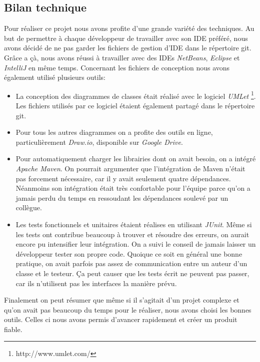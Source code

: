 \documentclass[10pt,a4paper]{book}
\begin{document}
\subsection{Bilan technique}
Pour réaliser ce projet nous avons profite d'une grande variété des techniques. Au but de permettre à chaque développeur de travailler avec son IDE préféré, nous avons décidé de ne pas garder les fichiers de gestion d'IDE dans le répertoire git. Grâce a çà, nous avons réussi à travailler avec des IDEs \textit{NetBeans}, \textit{Eclipse} et \textit{IntelliJ} en même temps. Concernant les fichiers de conception nous avons également utilisé plusieurs outils:
\begin{itemize}
	\item{La conception des diagrammes de classes était réalisé avec le logiciel \textit{UMLet} \footnote{http://www.umlet.com/}. Les fichiers utilisés par ce logiciel étaient également partagé dans le répertoire git.}
	\item{Pour tous les autres diagrammes on a profite des outils en ligne, particulièrement \textit{Draw.io}, disponible sur \textit{Google Drive}.}
	\item{Pour automatiquement charger les librairies dont on avait besoin, on a intégré \textit{Apache Maven}. On pourrait argumenter que l'intégration de Maven n'était pas forcement nécessaire, car il y avait seulement quatre dépendances. Néanmoins son intégration était très confortable pour l'équipe parce qu'on a jamais perdu du temps en ressoudant les dépendances soulevé par un collègue.}
	\item{Les tests fonctionnels et unitaires étaient réalises en utilisant \textit{JUnit}. Même si les tests ont contribue beaucoup à trouver et résoudre des erreurs, on aurait encore pu intensifier leur intégration. On a suivi le conseil de jamais laisser un développeur tester son propre code. Quoique ce soit en général une bonne pratique, on avait parfois pas assez de communication entre un auteur d'un classe et le testeur. Ça peut causer que les tests écrit ne peuvent pas passer, car ils n'utilisent pas les interfaces la manière prévu.}
\end{itemize}
Finalement on peut résumer que même si il s'agitait d'un projet complexe et qu'on avait pas beaucoup du temps pour le réaliser, nous avons choisi les bonnes outils. Celles ci nous avons permis d'avancer rapidement et créer un produit fiable.
\appendix{}
\end{document}
